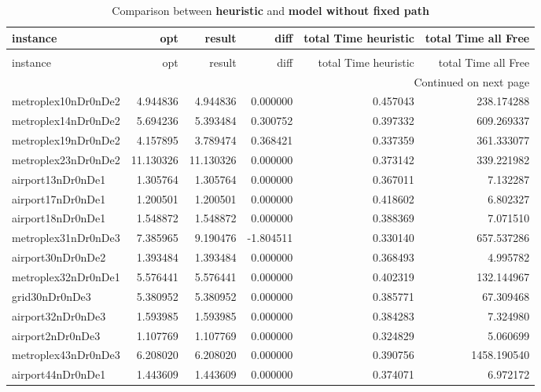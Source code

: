 \documentclass[../../../thesis.tex]{subfiles}
\begin{document}
\tiny
\begin{longtable}{|l|r|r|r|r|r|}
\caption{Comparison between \textbf{heuristic} and \textbf{model without fixed path} } \label{table:heuristic:compare} \\ \hline
instance & opt & result & diff & total Time heuristic & total Time all Free \\ \hline
\endfirsthead
\caption[]{Comparison between \textbf{heuristic} and \textbf{model without fixed path} } \\ \hline
instance & opt & result & diff & total Time heuristic & total Time all Free \\ \hline
\endhead
\hline
\multicolumn{6}{r}{Continued on next page} \\ \hline
\endfoot
\endlastfoot
metroplex10nDr0nDe2 & 4.944836 & 4.944836 & 0.000000 & 0.457043 & 238.174288 \\ \hline
metroplex14nDr0nDe2 & 5.694236 & 5.393484 & 0.300752 & 0.397332 & 609.269337 \\ \hline
metroplex19nDr0nDe2 & 4.157895 & 3.789474 & 0.368421 & 0.337359 & 361.333077 \\ \hline
metroplex23nDr0nDe2 & 11.130326 & 11.130326 & 0.000000 & 0.373142 & 339.221982 \\ \hline
airport13nDr0nDe1 & 1.305764 & 1.305764 & 0.000000 & 0.367011 & 7.132287 \\ \hline
airport17nDr0nDe1 & 1.200501 & 1.200501 & 0.000000 & 0.418602 & 6.802327 \\ \hline
airport18nDr0nDe1 & 1.548872 & 1.548872 & 0.000000 & 0.388369 & 7.071510 \\ \hline
metroplex31nDr0nDe3 & 7.385965 & 9.190476 & -1.804511 & 0.330140 & 657.537286 \\ \hline
airport30nDr0nDe2 & 1.393484 & 1.393484 & 0.000000 & 0.368493 & 4.995782 \\ \hline
metroplex32nDr0nDe1 & 5.576441 & 5.576441 & 0.000000 & 0.402319 & 132.144967 \\ \hline
grid30nDr0nDe3 & 5.380952 & 5.380952 & 0.000000 & 0.385771 & 67.309468 \\ \hline
airport32nDr0nDe3 & 1.593985 & 1.593985 & 0.000000 & 0.384283 & 7.324980 \\ \hline
airport2nDr0nDe3 & 1.107769 & 1.107769 & 0.000000 & 0.324829 & 5.060699 \\ \hline
metroplex43nDr0nDe3 & 6.208020 & 6.208020 & 0.000000 & 0.390756 & 1458.190540 \\ \hline
airport44nDr0nDe1 & 1.443609 & 1.443609 & 0.000000 & 0.374071 & 6.972172 \\ \hline

\end{longtable}
\end{document}
